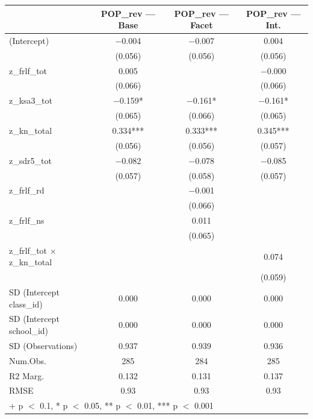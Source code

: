 \documentclass[
  10pt,
]{article}
\begin{document}
\begin{table}
\centering
\begin{tabular}[t]{lccc}
\toprule
  & POP\_rev — Base & POP\_rev — Facet & POP\_rev — Int.\\
\midrule
(Intercept) & \num{-0.004} & \num{-0.007} & \num{0.004}\\
 & (\num{0.056}) & (\num{0.056}) & (\num{0.056})\\
z\_frlf\_tot & \num{0.005} &  & \num{-0.000}\\
 & (\num{0.066}) &  & (\num{0.066})\\
z\_ksa3\_tot & \num{-0.159}* & \num{-0.161}* & \num{-0.161}*\\
 & (\num{0.065}) & (\num{0.066}) & (\num{0.065})\\
z\_kn\_total & \num{0.334}*** & \num{0.333}*** & \num{0.345}***\\
 & (\num{0.056}) & (\num{0.056}) & (\num{0.057})\\
z\_sdr5\_tot & \num{-0.082} & \num{-0.078} & \num{-0.085}\\
 & (\num{0.057}) & (\num{0.058}) & (\num{0.057})\\
z\_frlf\_rd &  & \num{-0.001} & \\
 &  & (\num{0.066}) & \\
z\_frlf\_ns &  & \num{0.011} & \\
 &  & (\num{0.065}) & \\
z\_frlf\_tot × z\_kn\_total &  &  & \num{0.074}\\
 &  &  & (\num{0.059})\\
SD (Intercept class\_id) & \num{0.000} & \num{0.000} & \num{0.000}\\
SD (Intercept school\_id) & \num{0.000} & \num{0.000} & \num{0.000}\\
SD (Observations) & \num{0.937} & \num{0.939} & \num{0.936}\\
\midrule
Num.Obs. & \num{285} & \num{284} & \num{285}\\
R2 Marg. & \num{0.132} & \num{0.131} & \num{0.137}\\
RMSE & \num{0.93} & \num{0.93} & \num{0.93}\\
\bottomrule
\multicolumn{4}{l}{\rule{0pt}{1em}+ p $<$ 0.1, * p $<$ 0.05, ** p $<$ 0.01, *** p $<$ 0.001}\\
\end{tabular}
\end{table}
\end{document}
